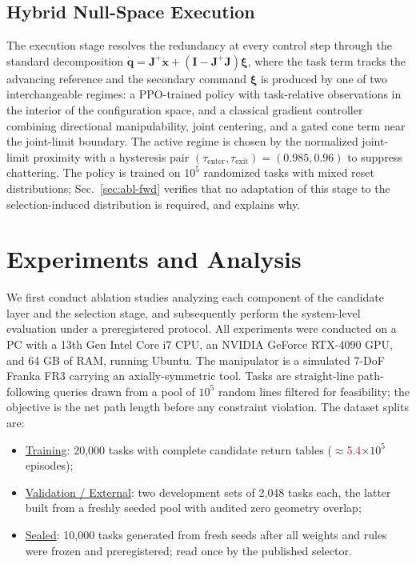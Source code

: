 \documentclass[journal]{IEEEtran}
\newcommand{\ph}[1]{\textcolor{red}{#1}}
\newcommand{\nTrain}{20{,}000}
\newcommand{\nDev}{2{,}048}
\newcommand{\nSealed}{10{,}000}
\begin{document}
\subsection{Hybrid Null-Space Execution}
The execution stage resolves the redundancy at every control step
through the standard decomposition
$\dot{\mathbf{q}}=\mathbf{J}^{+}\dot{\mathbf{x}}
+(\mathbf{I}-\mathbf{J}^{+}\mathbf{J})\boldsymbol{\xi}$, where the task
term tracks the advancing reference and the secondary command
$\boldsymbol{\xi}$ is produced by one of two interchangeable regimes: a
PPO-trained policy with task-relative observations in the interior of
the configuration space, and a classical gradient controller combining
directional manipulability, joint centering, and a gated cone term near
the joint-limit boundary. The active regime is chosen by the normalized
joint-limit proximity with a hysteresis pair
$(\tau_{\mathrm{enter}},\tau_{\mathrm{exit}})=(0.985,0.96)$ to suppress
chattering. The policy is trained on $10^{5}$ randomized tasks with
mixed reset distributions; Sec.~\ref{sec:abl-fwd} verifies that no
adaptation of this stage to the selection-induced distribution is
required, and explains why.

\section{Experiments and Analysis}
\label{sec:exp}
We first conduct ablation studies analyzing each component of the
candidate layer and the selection stage, and subsequently perform the
system-level evaluation under a preregistered protocol. All experiments
were conducted on a PC with a 13th Gen Intel Core i7 CPU, an NVIDIA
GeForce RTX-4090 GPU, and 64 GB of RAM, running Ubuntu. The manipulator
is a simulated 7-DoF Franka FR3 carrying an axially-symmetric tool.
Tasks are straight-line path-following queries drawn from a pool of
$10^{5}$ random lines filtered for feasibility; the objective is the net
path length before any constraint violation. The dataset splits are:

\begin{itemize}
\item[$\triangleright$] \underline{Training}: \nTrain{} tasks with
complete candidate return tables ($\approx$\ph{5.4}$\times10^{5}$
episodes);
\item[$\triangleright$] \underline{Validation / External}: two
development sets of \nDev{} tasks each, the latter built from a freshly
seeded pool with audited zero geometry overlap;
\item[$\triangleright$] \underline{Sealed}: \nSealed{} tasks generated
from fresh seeds after all weights and rules were frozen and
preregistered; read once by the published selector.
\end{itemize}
\end{document}
